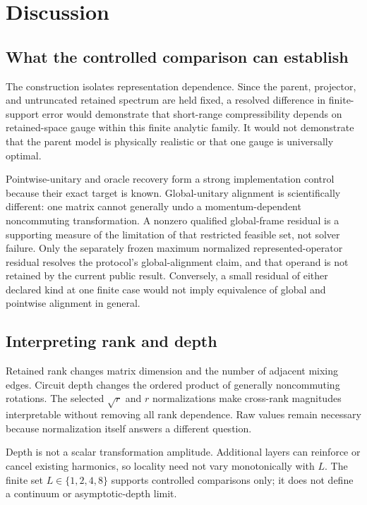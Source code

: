 \documentclass[11pt]{article}
\begin{document}
\section{Discussion}
\label{sec:discussion}

\subsection{What the controlled comparison can establish}

The construction isolates representation dependence. Since the parent, projector, and
untruncated retained spectrum are held fixed, a resolved difference in finite-support
error would demonstrate that short-range compressibility depends on retained-space gauge
within this finite analytic family. It would not demonstrate that the parent model is
physically realistic or that one gauge is universally optimal.

Pointwise-unitary and oracle recovery form a strong implementation control because their
exact target is known. Global-unitary alignment is scientifically different: one matrix
cannot generally undo a momentum-dependent noncommuting transformation. A nonzero qualified
global-frame residual is a supporting measure of the limitation of that restricted
feasible set, not solver failure. Only the separately frozen maximum normalized
represented-operator residual resolves the protocol's global-alignment claim, and that
operand is not retained by the current public result. Conversely, a small residual of
either declared kind at one finite case would not imply equivalence of global and
pointwise alignment in general.

\subsection{Interpreting rank and depth}

Retained rank changes matrix dimension and the number of adjacent mixing edges. Circuit
depth changes the ordered product of generally noncommuting rotations. The selected
$\sqrt r$ and $r$ normalizations make cross-rank magnitudes interpretable without
removing all rank dependence. Raw values remain necessary because normalization itself
answers a different question.

Depth is not a scalar transformation amplitude. Additional layers can reinforce or cancel
existing harmonics, so locality need not vary monotonically with $L$. The finite set
$L\in\{1,2,4,8\}$ supports controlled comparisons only; it does not define a continuum
or asymptotic-depth limit.
\end{document}
